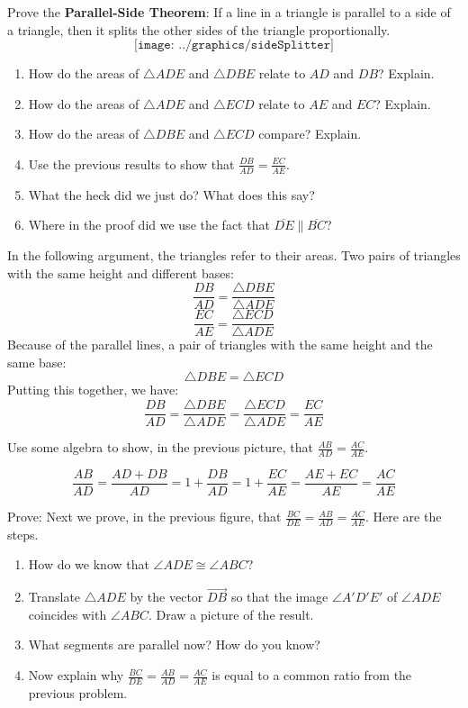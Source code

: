 \begin{prob}
Prove the \textbf{Parallel-Side Theorem}:  If a line in a triangle is parallel to a side of a triangle, then it splits the other sides of the triangle proportionally. 
$$\texttt{[image: ../graphics/sideSplitter]}$$
\begin{enumerate}
\item How do the areas of $\triangle ADE$ and $\triangle DBE$ relate to $AD$ and $DB$?  Explain.  
\item How do the areas of $\triangle ADE$ and $\triangle ECD$ relate to $AE$ and $EC$?  Explain. 
\item How do the areas of $\triangle DBE$ and $\triangle ECD$ compare?  Explain.  
\item Use the previous results to show that $\frac{DB}{AD} = \frac{EC}{AE}$.  
\item What the heck did we just do?  What does this say?
\item Where in the proof did we use the fact that $\overline{DE} \parallel \overline{BC}$?  
\end{enumerate}
\end{prob}

\begin{teachingnote}
In the following argument, the triangles refer to their areas.  
Two pairs of triangles with the same height and different bases:  
\[
\frac{DB}{AD} = \frac{\triangle DBE}{\triangle ADE}
\]
\[
\frac{EC}{AE} = \frac{\triangle ECD}{\triangle ADE}
\]
Because of the parallel lines, a pair of triangles with the same height and the same base:  
\[
\triangle DBE = \triangle ECD
\]
Putting this together, we have:  
\[
\frac{DB}{AD} = \frac{\triangle DBE}{\triangle ADE} = \frac{\triangle ECD}{\triangle ADE}
=\frac{EC}{AE}
\]
\end{teachingnote}


\begin{prob}
Use some algebra to show, in the previous picture, that $\frac{AB}{AD} = \frac{AC}{AE}$.
\end{prob}

\begin{teachingnote}
\[
\frac{AB}{AD} = \frac{AD+DB}{AD} = 1 + \frac{DB}{AD} =  1 + \frac{EC}{AE} 
= \frac{AE + EC}{AE} = \frac{AC}{AE}
\]
\end{teachingnote}

\begin{prob}
Prove:  Next we prove, in the previous figure, that $ \frac{BC}{DE} = \frac{AB}{AD} = \frac{AC}{AE}$.  Here are the steps.  
\begin{enumerate}
\item How do we know that $\angle ADE \cong \angle ABC$?  
\item Translate $\triangle ADE$ by the vector $\overrightarrow{DB}$ so that the image $\angle A'D'E'$ of $\angle ADE$ coincides with $\angle ABC$.  Draw a picture of the result.  
\item What segments are parallel now?  How do you know?  
\item Now explain why $\frac{BC}{DE} = \frac{AB}{AD} = \frac{AC}{AE}$ is equal to a common ratio from the previous problem.  
\end{enumerate}
\end{prob}

